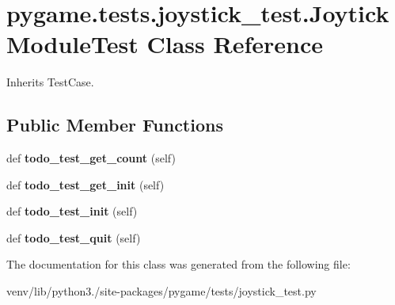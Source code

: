\hypertarget{classpygame_1_1tests_1_1joystick__test_1_1_joytick_module_test}{}\section{pygame.\+tests.\+joystick\+\_\+test.\+Joytick\+Module\+Test Class Reference}
\label{classpygame_1_1tests_1_1joystick__test_1_1_joytick_module_test}


Inherits Test\+Case.

\subsection*{Public Member Functions}
\begin{DoxyCompactItemize}
\item 
\mbox{\label{classpygame_1_1tests_1_1joystick__test_1_1_joytick_module_test_aaddd1d29525f4e08bd2225faf97d9562}} 
def {\bfseries todo\+\_\+test\+\_\+get\+\_\+count} (self)
\item 
\mbox{\label{classpygame_1_1tests_1_1joystick__test_1_1_joytick_module_test_ab376816cac5959e197331bf805061874}} 
def {\bfseries todo\+\_\+test\+\_\+get\+\_\+init} (self)
\item 
\mbox{\label{classpygame_1_1tests_1_1joystick__test_1_1_joytick_module_test_a66c2909d19517e7e2ec0f0506c260f7e}} 
def {\bfseries todo\+\_\+test\+\_\+init} (self)
\item 
\mbox{\label{classpygame_1_1tests_1_1joystick__test_1_1_joytick_module_test_a1c4b8b44c4d78a1ef81ff731a891daf6}} 
def {\bfseries todo\+\_\+test\+\_\+quit} (self)
\end{DoxyCompactItemize}


The documentation for this class was generated from the following file\+:\begin{DoxyCompactItemize}
\item 
venv/lib/python3./site-\/packages/pygame/tests/joystick\+\_\+test.\+py\end{DoxyCompactItemize}
